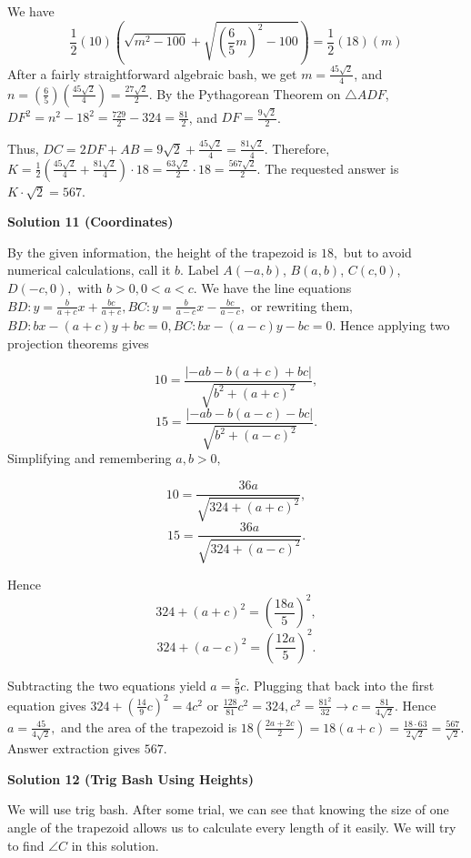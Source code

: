 \begin{enumerate}
 We have
 \[\frac{1}{2}(10)\left(\sqrt{m^2-100} + \sqrt{(\frac{6}{5}m)^2-100}\right) = \frac{1}{2}(18)(m)\]After a fairly straightforward algebraic bash, we get $m = \frac{45\sqrt{2}}{4}$, and $n = (\frac{6}{5})(\frac{45\sqrt{2}}{4}) = \frac{27\sqrt{2}}{2}$. By the Pythagorean Theorem on $\triangle ADF$, $DF^2 = n^2 - 18^2 = \frac{729}{2} - 324 = \frac{81}{2}$, and $DF = \frac{9\sqrt{2}}{2}$.

 Thus, $DC = 2DF + AB = 9\sqrt{2}+\frac{45\sqrt{2}}{4} = \frac{81\sqrt{2}}{4}$. Therefore, $K = \frac{1}{2}(\frac{45\sqrt{2}}{4}+\frac{81\sqrt{2}}{4}) \cdot 18 = \frac{63\sqrt{2}}{2} \cdot 18 = \frac{567\sqrt{2}}{2}$. The requested answer is $K \cdot \sqrt{2} = \boxed{567}$.

 


 



\textbf{Solution 11 (Coordinates)}

By the given information, the height of the trapezoid is $18,$ but to avoid numerical calculations, call it $b.$ Label $A(-a, b)$, $B(a, b)$, $C(c, 0)$, $D(-c, 0),$ with $b>0, 0<a<c.$ We have the line equations $BD: y=\frac{b}{a+c}x + \frac{bc}{a+c}, BC: y=\frac{b}{a-c}x - \frac{bc}{a-c},$ or rewriting them, $BD: bx-(a+c)y + bc=0, BC: bx - (a-c)y-bc = 0.$ Hence applying two projection theorems gives

 
 \[10 = \frac{|-ab - b(a+c) + bc|}{\sqrt{b^2 + (a+c)^2}},\]
 \[15 = \frac{|-ab - b(a-c) - bc|}{\sqrt{b^2 + (a-c)^2}}.\]Simplifying and remembering $a,b>0,$

 \[10 = \frac{36a}{\sqrt{324+(a+c)^2}},\]
 \[15 = \frac{36a}{\sqrt{324+(a-c)^2}}.\]

 Hence 
 \[324 + (a+c)^2 = \left(\frac{18a}{5}\right)^2,\]
 \[324 + (a-c)^2 = \left(\frac{12a}{5}\right)^2.\]

 Subtracting the two equations yield $a = \frac{5}{9}c.$ Plugging that back into the first equation gives $324 + \left(\frac{14}{9}c\right)^2 = 4c^2$ or $\frac{128}{81}c^2 = 324, c^2 = \frac{81^2}{32} \rightarrow c = \frac{81}{4\sqrt{2}}.$ Hence $a = \frac{45}{4\sqrt{2}},$ and the area of the trapezoid is $18 \left( \frac{2a + 2c}{2}\right) = 18(a+c) = \frac{18 \cdot 63}{2\sqrt{2}}=\frac{567}{\sqrt{2}}.$ Answer extraction gives $\boxed{567}.$




\textbf{Solution 12 (Trig Bash Using Heights)}

We will use trig bash. After some trial, we can see that knowing the size of one angle of the trapezoid allows us to calculate every length of it easily. We will try to find $\angle C$ in this solution.


\end{enumerate}
